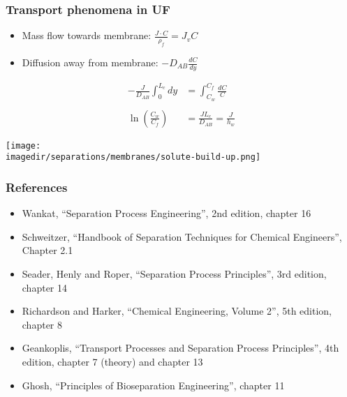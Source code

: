\begin{frame}\frametitle{Transport phenomena in UF}
	\begin{itemize}
		\item	Mass flow towards membrane: $\displaystyle \frac{J\cdot C}{\rho_f} = J_v C$
		\\
		\item	Diffusion away from membrane: $-D_{AB} \displaystyle \frac{dC}{dy}$
	\end{itemize}
	\[ 
		\begin{array}{rl}
			\displaystyle-\frac{J}{D_{AB}} \int_{0}^{L_c}{dy} &= \displaystyle \int_{C_w}^{C_f}{\frac{dC}{C}} \\ \\
			\displaystyle\ln\left(\frac{C_w}{C_f}\right) &= \displaystyle\frac{J L_c}{D_{AB}} = \displaystyle \frac{J}{h_w}
		\end{array}
			\]
	\begin{center}
		\texttt{[image: \\imagedir/separations/membranes/solute-build-up.png]}
	\end{center}	
\end{frame}

\begin{frame}\frametitle{References}
	\begin{itemize}
		\item	Wankat, ``Separation Process Engineering'', 2nd edition, chapter 16
		\item	Schweitzer, ``Handbook of Separation Techniques for Chemical Engineers'', Chapter 2.1
		\item	Seader, Henly and Roper, ``Separation Process Principles'', 3rd edition, chapter 14
		\item	Richardson and Harker, ``Chemical Engineering, Volume 2'', 5th edition, chapter 8
		\item	Geankoplis, ``Transport Processes and Separation Process Principles'', 4th edition, chapter 7 (theory) and chapter 13
		\item	Ghosh, ``Principles of Bioseparation Engineering'', chapter 11
	\end{itemize}
\end{frame}

